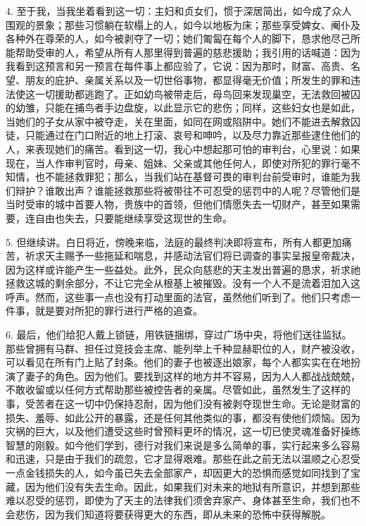 4. 至于我，当我坐着看到这一切：主妇和贞女们，惯于深居简出，如今成了众人围观的景象；那些习惯躺在软榻上的人，如今以地板为床；那些享受婢女、阉仆及各种外在尊荣的人，如今被剥夺了一切；她们匍匐在每个人的脚下，恳求他尽己所能帮助受审的人，希望从所有人那里得到普遍的慈悲援助；我引用的话喊道：因为我看到这预言和另一预言在每件事上都应验了，它说：因为那时，财富、高贵、名望、朋友的庇护、亲属关系以及一切世俗事物，都显得毫无价值；所发生的罪和违法使这一切援助都逃跑了。正如幼鸟被带走后，母鸟回来发现巢空，无法救回被囚的幼雏，只能在捕鸟者手边盘旋，以此显示它的悲伤；同样，这些妇女也是如此，当她们的子女从家中被夺走，关在里面，如同在网或陷阱中。她们不能进去解救囚徒，只能通过在门口附近的地上打滚、哀号和呻吟，以及尽力靠近那些逮住他们的人，来表现她们的痛苦。看到这一切，我心中想起那可怕的审判台，心里说：如果现在，当人作审判官时，母亲、姐妹、父亲或其他任何人，即使对所犯的罪行毫不知情，也不能拯救罪犯；那么，当我们站在基督可畏的审判台前受审时，谁能为我们辩护？谁敢出声？谁能拯救那些将被带往不可忍受的惩罚中的人呢？尽管他们是当时受审的城中首要人物，贵族中的首领，但他们情愿失去一切财产，甚至如果需要，连自由也失去，只要能继续享受这现世的生命。\par

5. 但继续讲。白日将近，傍晚来临，法庭的最终判决即将宣布，所有人都更加痛苦，祈求天主赐予一些拖延和喘息，并感动法官们将已调查的事实呈报皇帝裁决，因为这样或许能产生一些益处。此外，民众向慈悲的天主发出普遍的恳求，祈求祂拯救这城的剩余部分，不让它完全从根基上被摧毁。没有一个人不是流着泪加入这呼声。然而，这些事一点也没有打动里面的法官，虽然他们听到了。他们只考虑一件事，就是要对所犯的罪行进行严格的追查。\par

6. 最后，他们给犯人戴上锁链，用铁链捆绑，穿过广场中央，将他们送往监狱。那些曾拥有马群、担任过竞技会主席、能列举上千种显赫职位的人，财产被没收，可以看见在所有门上贴了封条。他们的妻子也被逐出娘家，每个人都实实在在地扮演了妻子的角色。因为他们。要找到这样的地方并不容易，因为人人都战战兢兢，不敢收留或以任何方式帮助那些被控告者的亲属。尽管如此，虽然发生了这样的事，受苦者在这一切中仍保持忍耐，因为他们没有被剥夺现世生命。无论是财富的损失、羞辱、如此公开的暴露，还是任何其他类似的事，都没有使他们烦恼。因为灾祸的巨大，以及他们遭受这些时曾预料更坏的情况，这一切已使灵魂准备好操练智慧的刚毅。如今他们学到，德行对我们来说是多么简单的事，实行起来多么容易和迅速，只是由于我们的疏忽，它才显得艰难。那些在此之前无法以温顺之心忍受一点金钱损失的人，如今虽已失去全部家产，却因更大的恐惧而感觉如同找到了宝藏，因为他们没有失去生命。因此，如果我们对未来的地狱有所意识，并想到那些难以忍受的惩罚，即使为了天主的法律我们须舍弃家产、身体甚至生命，我们也不会悲伤，因为我们知道将要获得更大的东西，即从未来的恐怖中获得解脱。\par

